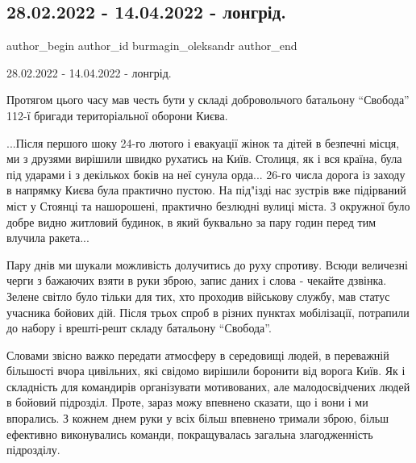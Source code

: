  
 
 
 
 
 
\subsection{28.02.2022 - 14.04.2022 - лонгрід.}
\label{sec:14_04_2022.fb.burmagin_oleksandr.1.longrid}
 
\ifcmt
 author_begin
   author_id burmagin_oleksandr
 author_end
\fi

28.02.2022 - 14.04.2022 - лонгрід. 

Протягом цього часу мав честь бути у складі добровольчого батальону \enquote{Свобода}
112-ї бригади територіальної оборони Києва.  

...Після першого шоку 24-го лютого і евакуації жінок та дітей в безпечні місця,
ми з друзями вирішили швидко рухатись на Київ. Столиця, як і вся країна, була
під ударами і з декількох боків на неї сунула орда... 26-го числа дорога із
заходу в напрямку Києва була практично пустою. На під"ізді нас зустрів вже
підірваний міст у Стоянці та нашорошені, практично безлюдні вулиці міста. З
окружної було добре видно житловий будинок, в який буквально за пару годин
перед тим влучила ракета...   


Пару днів ми шукали можливість долучитись до руху спротиву. Всюди величезні
черги з бажаючих взяти в руки зброю, запис даних і слова - чекайте дзвінка.
Зелене світло було тільки для тих, хто проходив військову службу, мав статус
учасника бойових дій. Після трьох спроб в різних пунктах мобілізації, потрапили
до набору і врешті-решт складу батальону \enquote{Свобода}. 

Словами звісно важко передати атмосферу в середовищі людей, в переважній
більшості вчора цивільних, які свідомо вирішили боронити від ворога Київ. Як і
складність для командирів організувати мотивованих, але малодосвідчених людей в
бойовий підрозділ. Проте, зараз можу впевнено сказати, що і вони і ми
впорались. З кожнем днем руки у всіх більш впевнено тримали зброю, більш
ефективно виконувались команди, покращувалась загальна злагодженність
підрозділу. 

